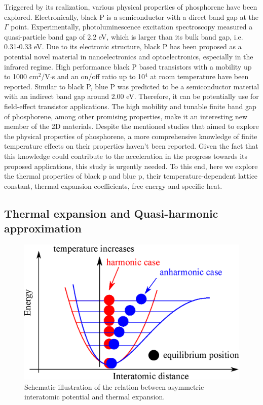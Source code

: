 Triggered by its realization, various physical properties of phosphorene have been explored. Electronically, black P is a semiconductor with a direct band gap at the $\Gamma$ point\cite{Zhu2014,deniz3}. Experimentally, photoluminescence excitation spectroscopy measured a quasi-particle band gap of 2.2 eV\cite{bp-ex-3}, which is larger than its bulk band gap, i.e. 0.31-0.33 eV\cite{Maruyama198199,Narita1983422}. Due to its electronic structure, black P has been proposed as a potential novel material in nanoelectronics and optoelectronics, especially in the infrared regime. High performance black P based transistors with a mobility up to 1000 cm$^2$/V$\cdot$s and an on/off ratio up to 10$^4$ at room temperature have been reported\cite{Li2014a,Han2014}. Similar to black P, blue P was predicted to be a semiconductor material with an indirect band gap around 2.00 eV\cite{Zhu2014}. Therefore, it can be potentially use for field-effect transistor applications. The high mobility and tunable finite band gap of phosphorene, among other promising properties\cite{Jain2015,Wei2014,Kou2014,Tahir2015,zhou2014}, make it an interesting new member of the 2D materials. Despite the mentioned studies that aimed to explore the physical properties of phosphorene, a more comprehensive knowledge of finite temperature effects on their properties haven't been reported. Given the fact that this knowledge could contribute to the acceleration in the progress towards its proposed applications, this study\cite{Aierken2015.thermalP} is urgently needed. To this end, here we explore the thermal properties of black p and blue p, their temperature-dependent lattice constant, thermal expansion coefficients, free energy and specific heat.

\subsection{Thermal expansion and Quasi-harmonic approximation}

\begin{figure}[htbp!] 
\centering
\includegraphics[width=0.8\linewidth]{anh_exp.eps}%
\caption{Schematic illustration of the relation between asymmetric interatomic potential and thermal expansion. }
\label{fig:anh_exp}
\end{figure}

